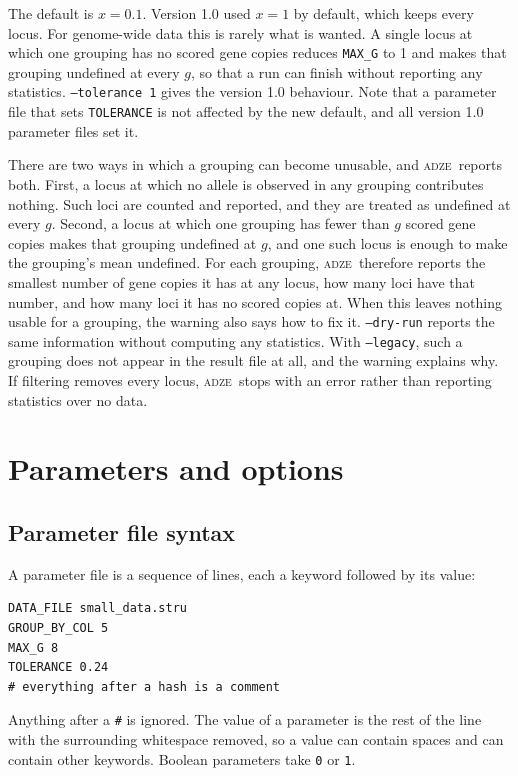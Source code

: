 \documentclass[11pt]{article}
\newcommand{\prog}{\textsc{adze}}
\newcommand{\flag}[1]{\texttt{#1}}
\begin{document}
The default is $x = 0.1$. Version 1.0 used $x = 1$ by default, which keeps
every locus. For genome-wide data this is rarely what is wanted. A single locus
at which one grouping has no scored gene copies reduces \texttt{MAX\_G} to 1
and makes that grouping undefined at every $g$, so that a run can finish
without reporting any statistics. \flag{--tolerance 1} gives the version 1.0
behaviour. Note that a parameter file that sets \texttt{TOLERANCE} is not
affected by the new default, and all version 1.0 parameter files set it.

There are two ways in which a grouping can become unusable, and \prog\ reports
both. First, a locus at which no allele is observed in any grouping
contributes nothing. Such loci are counted and reported, and they are treated
as undefined at every $g$. Second, a locus at which one grouping has fewer than
$g$ scored gene copies makes that grouping undefined at $g$, and one such locus
is enough to make the grouping's mean undefined. For each grouping, \prog\
therefore reports the smallest number of gene copies it has at any locus, how
many loci have that number, and how many loci it has no scored copies at. When
this leaves nothing usable for a grouping, the warning also says how to fix
it. \flag{--dry-run} reports the same information without computing any
statistics. With \flag{--legacy}, such a grouping does not appear in the result
file at all, and the warning explains why. If filtering removes every locus,
\prog\ stops with an error rather than reporting statistics over no data.

\section{Parameters and options}

\subsection{Parameter file syntax}

A parameter file is a sequence of lines, each a keyword followed by its value:
\begin{Verbatim}[xleftmargin=1em]
DATA_FILE small_data.stru
GROUP_BY_COL 5
MAX_G 8
TOLERANCE 0.24
# everything after a hash is a comment
\end{Verbatim}

\noindent Anything after a \texttt{\#} is ignored. The value of a parameter is
the rest of the line with the surrounding whitespace removed, so a value can
contain spaces and can contain other keywords. Boolean parameters take
\texttt{0} or \texttt{1}.
\end{document}
